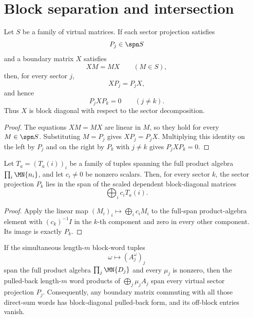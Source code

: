 \section{Block separation and intersection}\label{sec:block_separation_intersection}

\begin{lemma}
    \label{lem:block_diagonal_commutant_reduction_from_projection_span}
    \notready
    Let $S$ be a family of virtual matrices. If each sector projection satisfies
    \[
        P_j\in\spn S
    \]
    and a boundary matrix $X$ satisfies
    \[
        XM=MX\qquad (M\in S),
    \]
    then, for every sector $j$,
    \[
        XP_j=P_jX,
    \]
    and hence
    \[
        P_jXP_k=0\qquad (j\ne k).
    \]
    Thus $X$ is block diagonal with respect to the sector decomposition.
\end{lemma}

\begin{proof}
    \notready
    The equations $XM=MX$ are linear in $M$, so they hold for every
    $M\in\spn S$. Substituting $M=P_j$ gives $XP_j=P_jX$. Multiplying this
    identity on the left by $P_j$ and on the right by $P_k$ with $j\ne k$
    gives $P_jXP_k=0$.
\end{proof}

\begin{lemma}
    \label{lem:block_projection_span_from_product_algebra_span}
    \notready
    Let $T_a = (T_a(i))_i$ be a family of tuples spanning the full product algebra
    $\prod_i \MN{n_i}$, and let $c_i\neq0$ be nonzero scalars. Then, for every
    sector $k$, the sector projection $P_k$ lies in the span of the scaled
    dependent block-diagonal matrices
    \[
        \bigoplus_i c_i T_a(i).
    \]
\end{lemma}

\begin{proof}
    \notready
    Apply the linear map $(M_i)_i \mapsto \bigoplus_i c_i M_i$ to the full-span
    product-algebra element with $(c_k)^{-1} I$ in the $k$-th component and zero in
    every other component. Its image is exactly $P_k$.
\end{proof}

\begin{lemma}
    \label{lem:block_projection_span_from_product_word_span}
    \notready
    If the simultaneous length-$m$ block-word tuples
    \[
        \omega \longmapsto (A_j^{\omega})_j
    \]
    span the full product algebra $\prod_j \MN{D_j}$ and every $\mu_j$ is nonzero, then the
    pulled-back length-$m$ word products of $\bigoplus_j\mu_j A_j$ span every
    virtual sector projection $P_j$. Consequently, any boundary matrix commuting with all
    those direct-sum words has block-diagonal pulled-back form, and its off-block entries vanish.
\end{lemma}

